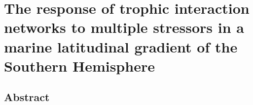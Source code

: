 \documentclass[
]{article}
\author{}
\date{\vspace{-2.5em}}
\begin{document}
\hypertarget{the-response-of-trophic-interaction-networks-to-multiple-stressors-in-a-marine-latitudinal-gradient-of-the-southern-hemisphere}{%
\section{The response of trophic interaction networks to multiple
stressors in a marine latitudinal gradient of the Southern
Hemisphere}\label{the-response-of-trophic-interaction-networks-to-multiple-stressors-in-a-marine-latitudinal-gradient-of-the-southern-hemisphere}}

\hypertarget{abstract}{%
\subsection{Abstract}\label{abstract}}
\end{document}
